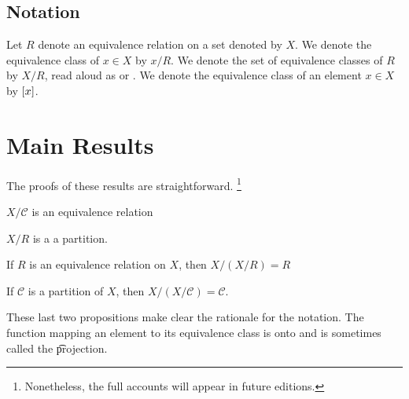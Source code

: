 \subsection*{Notation}

Let $R$ denote an equivalence relation on a set denoted by $X$.
We denote the equivalence class of $x \in X$ by $x / R$.
We denote the set of equivalence classes of $R$ by $X/R$, read aloud as  or .
We denote the equivalence class of an element $x \in X$ by $[x]$.

\section*{Main Results}

The proofs of these results are straightforward.
    \ifhmode\unskip\fi\footnote{
Nonetheless, the full accounts will appear in future editions.
    }

\begin{proposition}
$X/\mathcal{C} $ is an equivalence relation\end{proposition}
\begin{proposition}
$X/R$ is a a partition.\end{proposition}
\begin{proposition}
If $R$ is an equivalence relation on $X$, then $X/(X/R) = R$\end{proposition}
\begin{proposition}
If $\mathcal{C} $ is a partition of $X$, then $X/(X/\mathcal{C} ) = \mathcal{C} $.\end{proposition}
These last two propositions make clear the rationale for the notation.
The function mapping an element to its equivalence class is onto and is sometimes called the \t{projection}.

